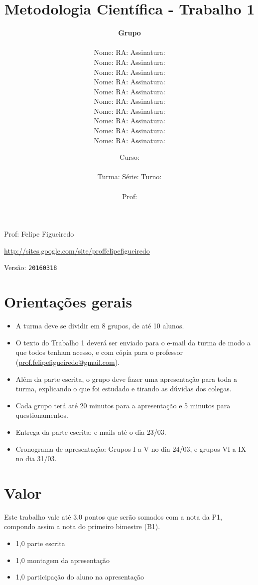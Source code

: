 \documentclass[a4paper]{article}
\date{
\bigskip
Curso: \underline{\hspace{8cm}}\\
\ \\
Turma: \underline{\hspace{1cm}} Série: \underline{\hspace{1cm}} Turno:
\underline{\hspace{1cm}}\\
\ \\
Prof: \underline{\hspace{8cm}}\\
}
\title{Metodologia Científica - Trabalho 1}
\author{
{\bf Grupo} \underline{\hspace{1cm}}\\
\ \\
Nome: \underline{\hspace{6cm}} RA: \underline{\hspace{2cm}} Assinatura: \underline{\hspace{4cm}}\\
Nome: \underline{\hspace{6cm}} RA: \underline{\hspace{2cm}} Assinatura: \underline{\hspace{4cm}}\\
Nome: \underline{\hspace{6cm}} RA: \underline{\hspace{2cm}} Assinatura: \underline{\hspace{4cm}}\\
Nome: \underline{\hspace{6cm}} RA: \underline{\hspace{2cm}} Assinatura: \underline{\hspace{4cm}}\\
Nome: \underline{\hspace{6cm}} RA: \underline{\hspace{2cm}} Assinatura: \underline{\hspace{4cm}}\\
Nome: \underline{\hspace{6cm}} RA: \underline{\hspace{2cm}} Assinatura: \underline{\hspace{4cm}}\\
Nome: \underline{\hspace{6cm}} RA: \underline{\hspace{2cm}} Assinatura: \underline{\hspace{4cm}}\\
Nome: \underline{\hspace{6cm}} RA: \underline{\hspace{2cm}} Assinatura: \underline{\hspace{4cm}}\\
Nome: \underline{\hspace{6cm}} RA: \underline{\hspace{2cm}} Assinatura: \underline{\hspace{4cm}}\\
Nome: \underline{\hspace{6cm}} RA: \underline{\hspace{2cm}} Assinatura: \underline{\hspace{4cm}}\\
}
\begin{document}
\newpage

\parbox[c]{.825\textwidth}{\raggedright%
{Prof: Felipe Figueiredo\par}
{\url{http://sites.google.com/site/proffelipefigueiredo}\par}
}

Versão: \verb|20160318|





\section{Orientações gerais}

\begin{itemize}
\item A turma deve se dividir em 8 grupos, de até 10 alunos.
\item O texto do Trabalho 1 deverá ser enviado para o e-mail da turma de modo a que todos tenham acesso, e com cópia para o professor (\url{prof.felipefigueiredo@gmail.com}).
\item Além da parte escrita, o grupo deve fazer uma apresentação para toda a turma, explicando o que foi estudado e tirando as dúvidas dos colegas.
\item Cada grupo terá até 20 minutos para a apresentação e 5 minutos para questionamentos.
\item Entrega da parte escrita: e-mails até o dia 23/03.
\item Cronograma de apresentação: Grupos I a V no dia 24/03, e grupos VI a IX no dia 31/03.
\end{itemize}

\section{Valor}
Este trabalho vale até $3.0$ pontos que serão somados com a nota da P1, compondo assim a nota do primeiro bimestre (B1).

\begin{itemize}
\item 1,0 parte escrita
\item 1,0 montagem da apresentação
\item 1,0 participação do aluno na apresentação
\end{itemize}
\end{document}
